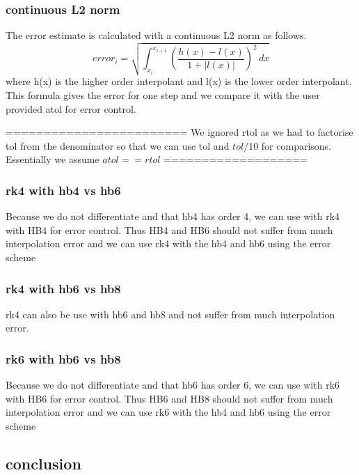 \subsubsection{continuous L2 norm}
The error estimate is calculated with a continuous L2 norm as follows.
\begin{equation}
error_i = \sqrt{ \int_{x_i}^{x_{i+1}} (\frac{h(x) - l(x)}{1 + |l(x)|})^2 \,dx }
\end{equation}
where h(x) is the higher order interpolant and l(x) is the lower order interpolant. This formula gives the error for one step and we compare it with the user provided atol for error control. 

========================
We ignored rtol as we had to factorise tol from the denominator so that we can use tol and $tol/10$ for comparisons. Essentially we assume $atol == rtol$
===================

\subsubsection{rk4 with hb4 vs hb6}
Because we do not differentiate and that hb4 has order 4, we can use with rk4 with HB4 for error control. Thus HB4 and HB6 should not suffer from much interpolation error and we can use rk4 with the hb4 and hb6 using the error scheme

\subsubsection{rk4 with hb6 vs hb8}
rk4 can also be use with hb6  and hb8 and not suffer from much interpolation error.

\subsubsection{rk6 with hb6 vs hb8}
Because we do not differentiate and that hb6 has order 6, we can use with rk6 with HB6 for error control. Thus HB6 and HB8 should not suffer from much interpolation error and we can use rk6 with the hb4 and hb6 using the error scheme

\subsection{conclusion}